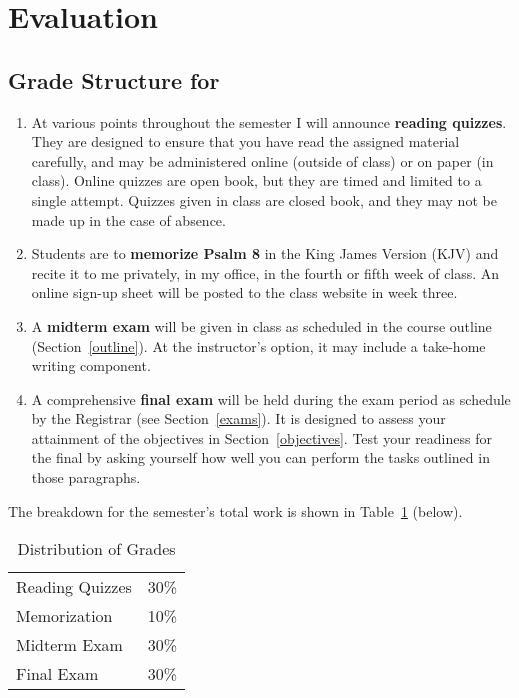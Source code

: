 \documentclass[titlepage]{article}
\begin{document}
\section{Evaluation}
\label{evaluation}

\subsection{Grade Structure for \ccode}
\label{structure}

\begin{enumerate}

	\item At various points throughout the semester I will announce
	\textbf{reading quizzes}. They are designed to ensure that you have
	read the assigned material carefully, and may be administered online
	(outside of class) or on paper (in class). Online quizzes are open
	book, but they are timed and limited to a single attempt. Quizzes
	given in class are closed book, and they may not be made up in the
	case of absence.

	\item Students are to \textbf{memorize Psalm 8} in the King James
	Version (KJV) and recite it to me privately, in my office, in the
	fourth or fifth week of class. An online sign-up sheet will be
	posted to the class website in week three.

	\item A \textbf{midterm exam} will be given in class as scheduled in
	the course outline (Section~\ref{outline}). At the instructor's
	option, it may include a take-home writing component.

	\item A comprehensive \textbf{final exam} will be held during the
	exam period as schedule by the Registrar (see Section~\ref{exams}).
	It is designed to assess your attainment of the objectives in
	Section~\ref{objectives}. Test your readiness for the final by
	asking yourself how well you can perform the tasks outlined in those
	paragraphs.

\end{enumerate}

The breakdown for the semester's total work is shown in Table~\ref{distribution} (below).

\begin{table}[htbp]
  \centering
  {\lining
  \begin{tabular}{lr}
    \toprule
    Reading Quizzes & 30\% \\
    Memorization    & 10\% \\
    Midterm Exam    & 30\% \\
    Final Exam      & 30\% \\
    \bottomrule
  \end{tabular}}
  \caption{Distribution of Grades}
  \label{distribution}
\end{table}
\end{document}
